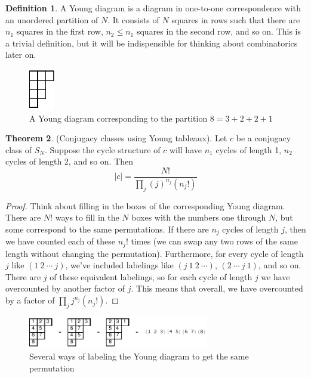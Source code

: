 \documentclass[12pt, letterpaper]{article}
\theoremstyle{definition} %
\newtheorem{thm}{Theorem}[section] %
\newtheorem{defn}[thm]{Definition} %
\begin{document}
\begin{defn}
  A Young diagram is a diagram in one-to-one correspondence with an unordered partition of $N$. It consists of $N$ squares
  in rows such that there are $n_1$ squares in the first row, $n_2\leq n_1$ squares in the second row, and so on. This is a trivial 
  definition, but it will be indispensible for thinking about combinatorics later on.

  \begin{figure}[H]
\centering
\includegraphics[width=0.1\textwidth]{fig1-young}
\caption*{A Young diagram corresponding to the partition $8=3+2+2+1$}
\label{figure-2}
\end{figure}

\end{defn}
\begin{thm} (Conjugacy classes using Young tableaux).
  Let $c$ be a conjugacy class of $S_N$. Suppose the cycle structure of $c$ will have $n_1$ cycles of length 1, $n_2$ cycles of length 2, and so on.
  Then $$|c|=\frac{N!}{\prod_j (j)^{n_j} (n_j!)}$$
\end{thm}
\begin{proof}
  Think about filling in the boxes of the corresponding Young diagram. There are $N!$ ways to fill in the $N$ boxes with the numbers one through $N$,
  but some correspond to the same permutations. If there are $n_j$ cycles of length $j$, then we have counted each of these $n_j!$ times (we can swap any two rows of the same length without changing the permutation). Furthermore,
  for every cycle of length $j$ like $(1\ 2\ \cdots\ j)$, we've included labelings like $(j\ 1\ 2\ \cdots)$, $(2\ \cdots\ j\ 1)$, and so on. There are
  $j$ of these equivalent labelings, so for each cycle of length $j$ we have overcounted by another factor of $j$. This means that overall, we have overcounted
  by a factor of $\prod_j j^{n_j} (n_j!)$. 
\end{proof}

  \begin{figure}[H]
\centering
\includegraphics[width=0.7\textwidth]{fig2-youngequivalent}
\caption*{Several ways of labeling the Young diagram to get the same permutation}
\label{figure-1}
\end{figure}
\end{document}
